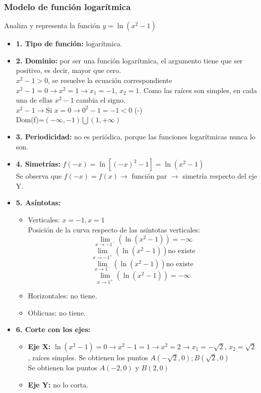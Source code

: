 \subsubsection{Modelo de función logarítmica}
Analiza y representa la función $y=\ln (x^2-1)$
\begin{itemize}
	\item \textbf{1. Tipo de función: }logarítmica.
	\item \textbf{2. Dominio: }por ser una función logarítmica, el argumento tiene que ser positivo, es decir, mayor que cero.\\
	$x^2-1 >0$, se resuelve la ecuación correspondiente $x^2-1 = 0 \rightarrow x^2=1 \rightarrow x_1=-1$, $x_2=1$. Como las raíces son simples, en cada una de ellas $x^2-1$ cambia el signo.\\
	$x^2-1 \rightarrow $Si $x=0 \rightarrow 0^2-1 = -1 <0$ (-)\\
	Dom(f)=$(-\infty , -1)\bigcup(1, +\infty)$
	\item \textbf{3. Periodicidad: }no es periódica, porque las funciones logarítmicas nunca lo son.
	\item \textbf{4. Simetrías: }$f(-x)= \ln[(-x)^2-1] = \ln(x^2-1)$\\
	Se observa que $f(-x)=f(x) \rightarrow$ función par $\rightarrow$ simetría respecto del eje Y.
	\item \textbf{5. Asíntotas: }
	\begin{itemize}
		\item Verticales: $x=-1, x=1$\\
		Posición de la curva respecto de las asíntotas verticales:
		$$\lim_{x \to -1^{-}}(\ln (x^2-1))=-\infty$$
		$$\lim_{x \to -1^{+}}(\ln (x^2-1)) \text{no existe}$$
		$$\lim_{x \to 1^{-}}(\ln (x^2-1)) \text{no existe}$$
		$$\lim_{x \to 1^{+}}(\ln (x^2-1))=-\infty$$
		\item Horizontales: no tiene.
		\item Oblicuas: no tiene.
	\end{itemize}
	\item \textbf{6. Corte con los ejes: }
	\begin{itemize}
		\item \textbf{Eje X: }$\ln(x^2-1) = 0 \rightarrow x^2-1=1 \rightarrow x^2=2 \rightarrow x_1=-\sqrt{2}$, $x_2=\sqrt{2}$, raíces simples. Se obtienen los puntos $A(-\sqrt{2},0); B(\sqrt{2},0)$\\
		Se obtienen los puntos $A(-2, 0)$ y $B(2,0)$
		\item \textbf{Eje Y: }no lo corta.

\end{itemize}
\end{itemize}
